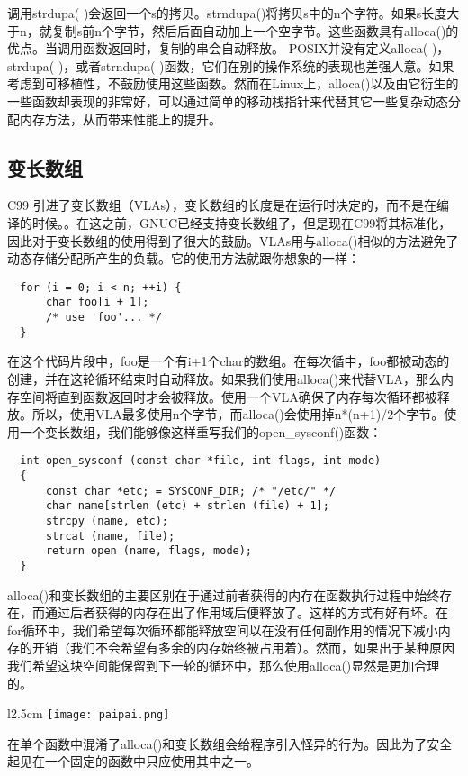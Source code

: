 调用strdupa( )会返回一个s的拷贝。strndupa()将拷贝s中的n个字符。如果s长度大于n，就复制s前n个字节，然后后面自动加上一个空字节。这些函数具有alloca()的优点。当调用函数返回时，复制的串会自动释放。 POSIX并没有定义alloca( )， strdupa( )，或者strndupa( )函数，它们在别的操作系统的表现也差强人意。如果考虑到可移植性，不鼓励使用这些函数。然而在Linux上，alloca()以及由它衍生的一些函数却表现的非常好，可以通过简单的移动栈指针来代替其它一些复杂动态分配内存方法，从而带来性能上的提升。

\subsection{变长数组}

C99 引进了变长数组（VLAs），变长数组的长度是在运行时决定的，而不是在编译的时候。。在这之前，GNUC已经支持变长数组了，但是现在C99将其标准化，因此对于变长数组的使用得到了很大的鼓励。VLAs用与alloca()相似的方法避免了动态存储分配所产生的负载。它的使用方法就跟你想象的一样： 

\begin{lstlisting}
  for (i = 0; i < n; ++i) {
      char foo[i + 1];
      /* use 'foo'... */
  }
\end{lstlisting}

在这个代码片段中，foo是一个有i+1个char的数组。在每次循中，foo都被动态的创建，并在这轮循环结束时自动释放。如果我们使用alloca()来代替VLA，那么内存空间将直到函数返回时才会被释放。使用一个VLA确保了内存每次循环都被释放。所以，使用VLA最多使用n个字节，而alloca()会使用掉n*(n+1)/2个字节。使用一个变长数组，我们能够像这样重写我们的open\_sysconf()函数： 

\begin{lstlisting}
  int open_sysconf (const char *file, int flags, int mode)
  {
      const char *etc; = SYSCONF_DIR; /* "/etc/" */
      char name[strlen (etc) + strlen (file) + 1];
      strcpy (name, etc);
      strcat (name, file);
      return open (name, flags, mode);
  }
\end{lstlisting}

alloca()和变长数组的主要区别在于通过前者获得的内存在函数执行过程中始终存在，而通过后者获得的内存在出了作用域后便释放了。这样的方式有好有坏。在for循环中，我们希望每次循环都能释放空间以在没有任何副作用的情况下减小内存的开销（我们不会希望有多余的内存始终被占用着）。然而，如果出于某种原因我们希望这块空间能保留到下一轮的循环中，那么使用alloca()显然是更加合理的。

\begin{wrapfigure}{l}{2.5cm}
  \texttt{[image: paipai.png]}
\end{wrapfigure}
\mbox{}\begin{flushleft}在单个函数中混淆了alloca()和变长数组会给程序引入怪异的行为。因此为了安全起见在一个固定的函数中只应使用其中之一。 \end{flushleft}

